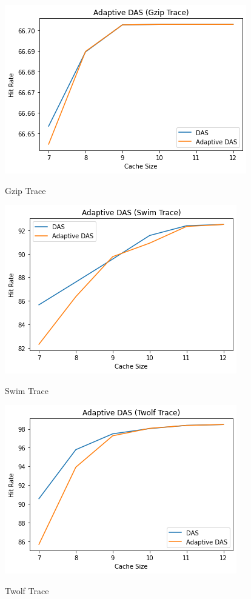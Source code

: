 \documentclass[conference]{IEEEtran}
\begin{document}
 \begin{figure}
        \centering
       \includegraphics[scale=0.6]{adaptive_gzip.png}~
       \caption{Gzip Trace}\label{Fig:1}
 \end{figure}

 \begin{figure}
        \centering
       \includegraphics[scale=0.6]{adaptive_swim.png}~
       \caption{Swim Trace}\label{Fig:1}
 \end{figure}

 \begin{figure}
        \centering
       \includegraphics[scale=0.6]{adaptive_twolf.png}~
       \caption{Twolf Trace}\label{Fig:1}
 \end{figure}
\end{document}
